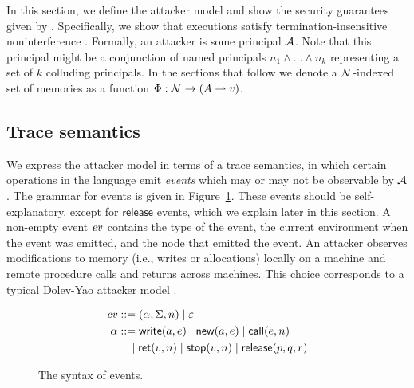 In this section, we define the attacker model and show the security guarantees given by \lang. Specifically, we show that \lang{} executions satisfy termination-insensitive noninterference \cite{4223226}. Formally, an attacker is some principal $\mathcal{A}$. Note that this principal might be a conjunction of named principals $n_1 \wedge \dots \wedge n_k$ representing a set of $k$ colluding principals. In the sections that follow we denote a $\mathcal{N}$-indexed set of memories as a function $\Phi: \mathcal{N} \to (A \rightharpoonup v)$.

\subsection{Trace semantics}
We express the attacker model in terms of a trace semantics, in which certain operations in the language emit \emph{events} which may or may not be observable by $\mathcal{A}$. The grammar for events is given in Figure~\ref{fig:event-syntax}. These events should be self-explanatory, except for $\mathsf{release}$ events, which we explain later in this section. A non-empty event $\mathit{ev}$ contains the type of the event, the current environment when the event was emitted, and the node that emitted the event. An attacker observes modifications to memory (i.e., writes or allocations) locally on a machine and remote procedure calls and returns across machines. This choice corresponds to a typical Dolev-Yao attacker model \cite{Dolev:1981:SPK:1382435.1382728}.

\begin{figure}
\centering
\begin{align*}
\mathit{ev} &::= (\alpha, \Sigma, n) \mid \varepsilon\\
\alpha &::= \mathsf{write}(a, e) \mid \mathsf{new}(a, e) \mid \mathsf{call}(e, n) \\ &\quad \mid \mathsf{ret}(v, n) \mid \mathsf{stop}(v, n) \mid \mathsf{release}(p, q, r)
\end{align*}
\caption{The syntax of events.}
\label{fig:event-syntax}
\end{figure}


